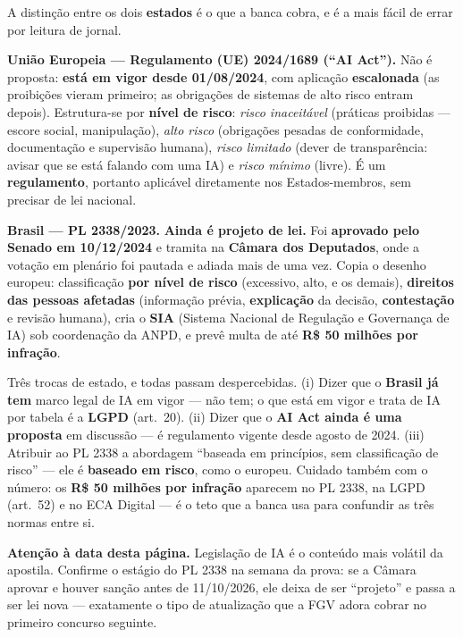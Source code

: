 \begin{conceito}
A distinção entre os dois \textbf{estados} é o que a banca cobra, e é a mais
fácil de errar por leitura de jornal.

\textbf{União Europeia --- Regulamento (UE) 2024/1689 (``AI Act'').} Não é
proposta: \textbf{está em vigor desde 01/08/2024}, com aplicação
\textbf{escalonada} (as proibições vieram primeiro; as obrigações de sistemas
de alto risco entram depois). Estrutura-se por \textbf{nível de risco}:
\emph{risco inaceitável} (práticas proibidas --- escore social, manipulação),
\emph{alto risco} (obrigações pesadas de conformidade, documentação e
supervisão humana), \emph{risco limitado} (dever de transparência: avisar que
se está falando com uma IA) e \emph{risco mínimo} (livre). É um
\textbf{regulamento}, portanto aplicável diretamente nos Estados-membros, sem
precisar de lei nacional.

\textbf{Brasil --- PL 2338/2023.} \textbf{Ainda é projeto de lei.} Foi
\textbf{aprovado pelo Senado em 10/12/2024} e tramita na \textbf{Câmara dos
Deputados}, onde a votação em plenário foi pautada e adiada mais de uma vez.
Copia o desenho europeu: classificação \textbf{por nível de risco} (excessivo,
alto, e os demais), \textbf{direitos das pessoas afetadas} (informação prévia,
\textbf{explicação} da decisão, \textbf{contestação} e revisão humana), cria o
\textbf{SIA} (Sistema Nacional de Regulação e Governança de IA) sob
coordenação da ANPD, e prevê multa de até \textbf{R\$ 50 milhões por
infração}.
\end{conceito}

\begin{pegadinha}
Três trocas de estado, e todas passam despercebidas. (i) Dizer que o
\textbf{Brasil já tem} marco legal de IA em vigor --- não tem; o que está em
vigor e trata de IA por tabela é a \textbf{LGPD} (art.\ 20). (ii) Dizer que o
\textbf{AI Act ainda é uma proposta} em discussão --- é regulamento vigente
desde agosto de 2024. (iii) Atribuir ao PL 2338 a abordagem ``baseada em
princípios, sem classificação de risco'' --- ele é \textbf{baseado em risco},
como o europeu. Cuidado também com o número: os \textbf{R\$ 50 milhões por
infração} aparecem no PL 2338, na LGPD (art.\ 52) e no ECA Digital --- é o
teto que a banca usa para confundir as três normas entre si.
\end{pegadinha}

\textbf{Atenção à data desta página.} Legislação de IA é o conteúdo mais
volátil da apostila. Confirme o estágio do PL 2338 na semana da prova: se a
Câmara aprovar e houver sanção antes de 11/10/2026, ele deixa de ser
``projeto'' e passa a ser lei nova --- exatamente o tipo de atualização que a
FGV adora cobrar no primeiro concurso seguinte.

